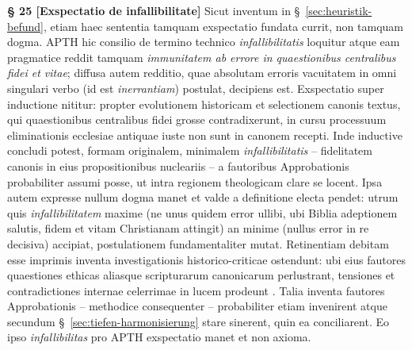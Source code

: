 \documentclass[11pt,a4paper]{article}
\makeatletter
\newcommand{\apth}{{\apthfont APTH}\hspace{0.15em}\xspace}
\newcommand{\apthsec}[3]{%
  \phantomsection%
  \def\@currentlabel{#1}%
  \label{sec:#3}%
  \textbf{§ #1 [#2]}%
}
\makeatother
\begin{document}
\apthsec{25}{Exspectatio de infallibilitate}{infallibilitaet} Sicut inventum in §~\ref{sec:heuristik-befund}, etiam haec sententia tamquam exspectatio fundata currit, non tamquam dogma. \apth hic consilio de termino technico \textit{infallibilitatis} loquitur atque eam pragmatice reddit tamquam \textit{immunitatem ab errore in quaestionibus centralibus fidei et vitae}; diffusa autem redditio, quae absolutam erroris vacuitatem in omni singulari verbo (id est \textit{inerrantiam}) postulat, decipiens est. Exspectatio super inductione nititur: propter evolutionem historicam et selectionem canonis textus, qui quaestionibus centralibus fidei grosse contradixerunt, in cursu processuum eliminationis ecclesiae antiquae iuste non sunt in canonem recepti. Inde inductive concludi potest, formam originalem, minimalem \textit{infallibilitatis} -- fidelitatem canonis in eius propositionibus nucleariis -- a fautoribus Approbationis probabiliter assumi posse, ut intra regionem theologicam clare se locent. Ipsa autem expresse nullum dogma manet et valde a definitione electa pendet: utrum quis \textit{infallibilitatem} maxime (ne unus quidem error ullibi, ubi Biblia adeptionem salutis, fidem et vitam Christianam attingit) an minime (nullus error in re decisiva) accipiat, postulationem fundamentaliter mutat. Retinentiam debitam esse imprimis inventa investigationis historico-criticae ostendunt: ubi eius fautores quaestiones ethicas aliasque scripturarum canonicarum perlustrant, tensiones et contradictiones internae celerrimae in lucem prodeunt \citep{dunn1977,kaesemann1951,ehrman2009}. Talia inventa fautores Approbationis -- methodice consequenter -- probabiliter etiam invenirent atque secundum §~\ref{sec:tiefen-harmonisierung} stare sinerent, quin ea conciliarent. Eo ipso \textit{infallibilitas} pro \apth exspectatio manet et non axioma.
\end{document}
